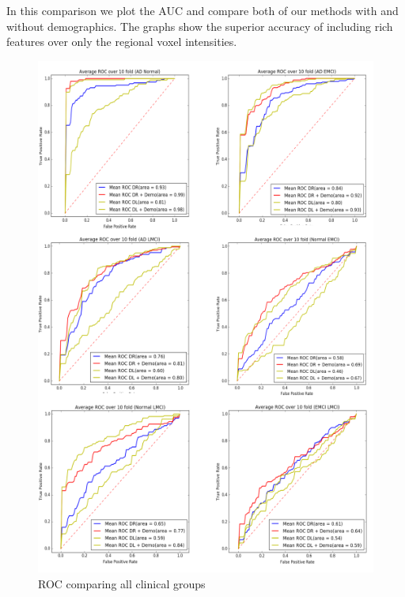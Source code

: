 \documentclass[authoryear,preprint,revi	ew,12pt]{elsarticle}
\begin{document}
In this comparison we plot the AUC and compare both of our methods with and without demographics. The graphs show the superior accuracy of including rich features over only the regional voxel intensities. 
\clearpage
\begin{figure}[!h]
	\centering
	\includegraphics[width=0.9\linewidth]{figures/auc.png}
	\caption{ROC comparing all clinical groups}
	\label{fig:auc}
\end{figure}
\end{document}
